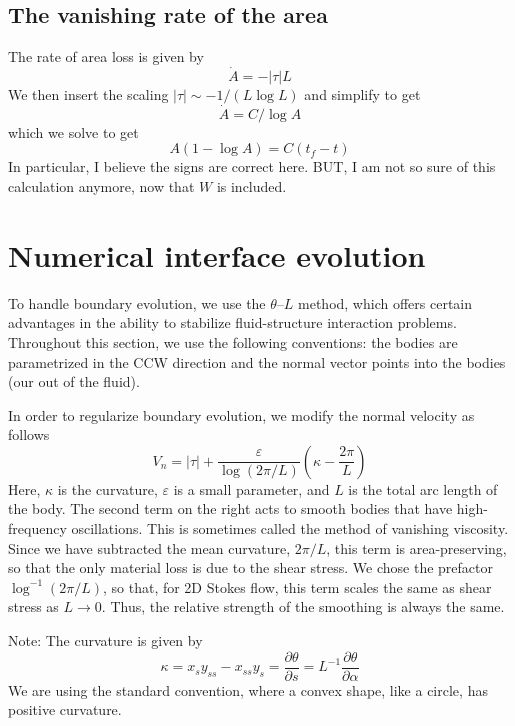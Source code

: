 \documentclass[11pt]{article}
\newcommand{\pd}[2]    { \frac{\partial #1} {\partial #2} }
\newcommand{\abs}[1]{\left| #1 \right|}
\newcommand{\eps}{\varepsilon}
\newcommand{\atau}{\abs{\tau}}
\newcommand{\thL}{$\theta$--$L$}
\newcommand{\Vn}{V_n}
\begin{document}
\subsection{The vanishing rate of the area}
The rate of area loss is given by
\begin{equation}
\dot{A} = - \abs{\tau} L
\end{equation}
We then insert the scaling $\abs{\tau} \sim -1/(L \log L)$ and simplify to get
\begin{equation}
\dot{A} = C/\log{A}
\end{equation}
which we solve to get
\begin{equation}
A (1 - \log A) = C (t_f - t)
\end{equation}
In particular, I believe the signs are correct here.
BUT, I am not so sure of this calculation anymore, now that $W$ is included.


\section{Numerical interface evolution}

To handle boundary evolution, we use the {\thL} method, which offers certain advantages in the ability to stabilize fluid-structure interaction problems. Throughout this section, we use the following conventions: the bodies are parametrized in the CCW direction and the normal vector points into the bodies (our out of the fluid).

In order to regularize boundary evolution, we modify the normal velocity as follows
\begin{equation}
\label{eqn:Vn}
\Vn = \atau + \frac{\eps}{\log \left(2\pi/L \right)} \left(\kappa - \frac{2 \pi}{L} \right)
\end{equation}
Here, $\kappa$ is the curvature, $\eps$ is a small parameter, and $L$ is the total arc length of the body. The second term on the right acts to smooth bodies that have high-frequency oscillations. This is sometimes called the method of vanishing viscosity. Since we have subtracted the mean curvature, $2\pi/L$, this term is area-preserving, so that the only material loss is due to the shear stress. We chose the prefactor $\log^{-1} \left(2\pi/L \right)$, so that, for 2D Stokes flow, this term scales the same as shear stress as $L \to 0$. Thus, the relative strength of the smoothing is always the same. 


Note: The curvature is given by
\begin{equation}
\kappa = x_s y_{ss} - x_{ss} y_s = \pd{\theta}{s} = L^{-1} \pd{\theta}{\alpha}
\end{equation}
We are using the standard convention, where a convex shape, like a circle, has positive curvature.
\end{document}
